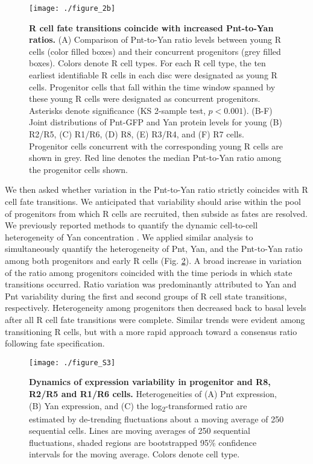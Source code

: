\begin{figure}[h!]
\centering
\vspace{0pt}
\texttt{[image: ./figure\_2b]}
\caption[R cell fate transitions coincide with increased Pnt-to-Yan ratios.]{\textbf{R cell fate transitions coincide with increased Pnt-to-Yan ratios.} (A) Comparison of Pnt-to-Yan ratio levels between young R cells (color filled boxes) and their concurrent progenitors (grey filled boxes). Colors denote R cell types. For each R cell type, the ten earliest identifiable R cells in each disc were designated as young R cells. Progenitor cells that fall within the time window spanned by these young R cells were designated as concurrent progenitors. Asterisks denote significance (KS 2-sample test, $p<0.001$). (B-F) Joint distributions of Pnt-GFP and Yan protein levels for young (B) R2/R5, (C) R1/R6, (D) R8, (E) R3/R4, and (F) R7 cells. Progenitor cells concurrent with the corresponding young R cells are shown in grey. Red line denotes the median Pnt-to-Yan ratio among the progenitor cells shown.}
\label{fig:ratio:fig2b}
\end{figure}

We then asked whether variation in the Pnt-to-Yan ratio strictly coincides with R cell fate transitions. We anticipated that variability should arise within the pool of progenitors from which R cells are recruited, then subside as fates are resolved. We previously reported methods to quantify the dynamic cell-to-cell heterogeneity of Yan concentration \cite{Pelaez2015a}. We applied similar analysis to simultaneously quantify the heterogeneity of Pnt, Yan, and the Pnt-to-Yan ratio among both progenitors and early R cells (Fig. \ref{fig:ratio:figS3}). A broad increase in variation of the ratio among progenitors coincided with the time periods in which state transitions occurred. Ratio variation was predominantly attributed to Yan and Pnt variability during the first and second groups of R cell state transitions, respectively. Heterogeneity among progenitors then decreased back to basal levels after all R cell fate transitions were complete. Similar trends were evident among transitioning R cells, but with a more rapid approach toward a consensus ratio following fate specification.

\begin{figure}[h]
\centering
\texttt{[image: ./figure\_S3]}
\caption[Dynamics of expression variability in progenitors and R cells.]{\textbf{Dynamics of expression variability in progenitor and R8, R2/R5 and R1/R6 cells.} Heterogeneities of (A) Pnt expression, (B) Yan expression, and (C) the log\textsubscript{2}-transformed ratio are estimated by de-trending fluctuations about a moving average of 250 sequential cells. Lines are moving averages of 250 sequential fluctuations, shaded regions are bootstrapped 95\% confidence intervals for the moving average. Colors denote cell type.}
\label{fig:ratio:figS3}
\end{figure}

